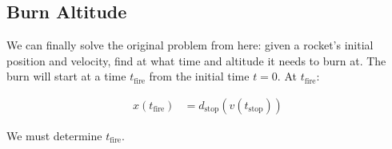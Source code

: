 \documentclass{article}
\begin{document}
\subsection{Burn Altitude}

We can finally solve the original problem from here:	
	given a rocket's initial position and velocity, find at what
	time and altitude it needs to burn at.
The burn will start at a time $t_\text{fire}$ from the initial time $t=0$.
At $t_\text{fire}$:

\begin{align}
	x(t_\text{fire}) & = d_\text{stop}(v(t_\text{stop}))
\end{align}

We must determine $t_\text{fire}$.
\end{document}

